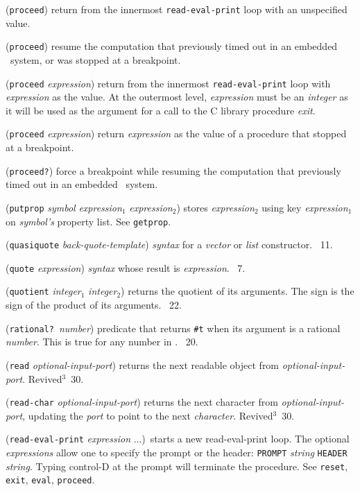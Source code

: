 \documentclass[10pt,twocolumn]{article}
\begin{document}
(\texttt{proceed}) return from the innermost \texttt{read-eval-print}
loop with an unspecified value.

(\texttt{proceed}) resume the computation that previously timed out in
an embedded \StoC\ system, or was stopped at a breakpoint.

(\texttt{proceed} \emph{expression}) return from the innermost
\texttt{read-eval-print} loop with \emph{expression} as the value.  At
the outermost level, \emph{expression} must be an \emph{integer} as it
will be used as the argument for a call to the C library procedure
\emph{exit}.

(\texttt{proceed} \emph{expression}) return \emph{expression} as the
value of a procedure that stopped at a breakpoint.

(\texttt{proceed?}) force a breakpoint while resuming the computation
that previously timed out in an embedded \StoC\ system.

(\texttt{putprop} \emph{symbol} \emph{expression}$_1$
\emph{expression}$_2$) stores \emph{expression}$_2$ using key
\emph{expression}$_1$ on \emph{symbol's} property list.  See
\texttt{getprop}.

(\texttt{quasiquote} \emph{back-quote-template}) \emph{syntax} for a
\emph{vector} or \emph{list} constructor.  \RRRRRS~11.

(\texttt{quote} \emph{expression}) \emph{syntax} whose result is
\emph{expression}.  \RRRRRS~7.

(\texttt{quotient} \emph{integer}$_1$ \emph{integer}$_2$) returns the
quotient of its arguments.  The sign is the sign of the product of its
arguments. \RRRRRS~22.

(\texttt{rational?}\ \emph{number}) predicate that returns
\texttt{\#t} when its argument is a rational \emph{number}.  This is
true for any number in \StoC.  \RRRRRS~20.

(\texttt{read} \emph{optional-input-port}) returns the next readable
object from \emph{optional-input-port}.  Revived$^3$~30.

(\texttt{read-char} \emph{optional-input-port}) returns the next
character from \emph{optional-input-port}, updating the \emph{port} to
point to the next \emph{character}.  Revived$^3$~30.

(\texttt{read-eval-print} \emph{expression} ...)\ starts a new
read-eval-print loop.  The optional \emph{expressions} allow one to
specify the prompt or the header: \texttt{PROMPT} \emph{string}
\texttt{HEADER} \emph{string}.  Typing control-D at the prompt will
terminate the procedure.  See \texttt{reset}, \texttt{exit},
\texttt{eval}, \texttt{proceed}.
\end{document}
